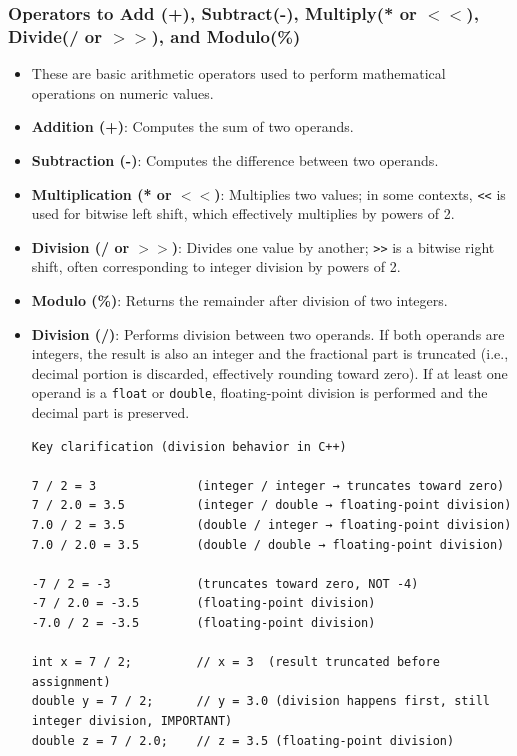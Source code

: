 \documentclass[10pt]{article}
\newcommand{\pbreak}{\vspace{30pt}}
\begin{document}
\newpage

\subsubsection{Operators to Add (+), Subtract(-), Multiply(* or $<<$), Divide(/ or $>>$), and Modulo(\%)}
\begin{itemize}
	\item These are basic arithmetic operators used to perform mathematical operations on numeric values.

	\item \textbf{Addition (+)}: Computes the sum of two operands.

	\item \textbf{Subtraction (-)}: Computes the difference between two operands.

	\item \textbf{Multiplication (* or $<<$)}: Multiplies two values; in some contexts, \verb|<<| is used for bitwise left shift, which effectively multiplies by powers of 2.

	\item \textbf{Division (/ or $>>$)}: Divides one value by another; \verb|>>| is a bitwise right shift, often corresponding to integer division by powers of 2.

	\item \textbf{Modulo (\%)}: Returns the remainder after division of two integers.

	\pbreak

	\item \textbf{Division (/)}: Performs division between two operands. If both operands are integers, the result is also an integer and the fractional part is truncated (i.e., decimal portion is discarded, effectively rounding toward zero). If at least one operand is a \verb|float| or \verb|double|, floating-point division is performed and the decimal part is preserved.

\begin{verbatim}
Key clarification (division behavior in C++)

7 / 2 = 3              (integer / integer → truncates toward zero)
7 / 2.0 = 3.5          (integer / double → floating-point division)
7.0 / 2 = 3.5          (double / integer → floating-point division)
7.0 / 2.0 = 3.5        (double / double → floating-point division)

-7 / 2 = -3            (truncates toward zero, NOT -4)
-7 / 2.0 = -3.5        (floating-point division)
-7.0 / 2 = -3.5        (floating-point division)

int x = 7 / 2;         // x = 3  (result truncated before assignment)
double y = 7 / 2;      // y = 3.0 (division happens first, still integer division, IMPORTANT)
double z = 7 / 2.0;    // z = 3.5 (floating-point division) 
\end{verbatim}
\end{itemize}
\end{document}
